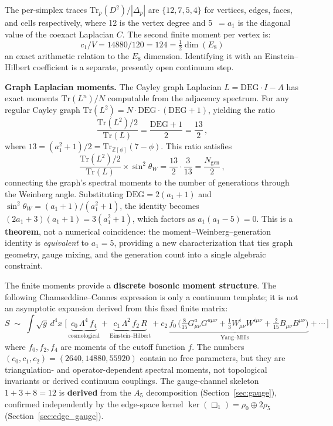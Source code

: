 \documentclass[12pt,a4paper]{article}
\theoremstyle{definition}
\begin{document}
The per-simplex traces $\mathrm{Tr}_p(D^2) / |\Delta_p|$ are $\{12, 7, 5, 4\}$ for vertices, edges, faces, and cells respectively, where 12 is the vertex degree and 5~$= a_1$ is the diagonal value of the coexact Laplacian $C$. The second finite moment per vertex is:
\begin{equation}
c_1 / V = 14880 / 120 = 124 = \tfrac{1}{2}\dim(E_8)
\end{equation}
an exact arithmetic relation to the $E_8$ dimension.  Identifying it with an
Einstein--Hilbert coefficient is a separate, presently open continuum step.

\textbf{Graph Laplacian moments.}  The Cayley graph Laplacian $L = \mathrm{DEG}\cdot I - A$ has exact moments $\mathrm{Tr}(L^n)/N$ computable from the adjacency spectrum.  For any regular Cayley graph $\mathrm{Tr}(L^2) = N\cdot\mathrm{DEG}\cdot(\mathrm{DEG}+1)$, yielding the ratio
\begin{equation}
\frac{\mathrm{Tr}(L^2)/2}{\mathrm{Tr}(L)} = \frac{\mathrm{DEG}+1}{2} = \frac{13}{2}\,,
\end{equation}
where $13 = (a_1^2+1)/2 = \mathrm{Tr}_{\mathbb{Z}[\phi]}(7-\phi)$.  This ratio satisfies
\begin{equation}
\frac{\mathrm{Tr}(L^2)/2}{\mathrm{Tr}(L)} \times \sin^2\theta_W = \frac{13}{2}\cdot\frac{3}{13} = \frac{N_{\mathrm{gen}}}{2}\,,
\label{eq:moment_weinberg}
\end{equation}
connecting the graph's spectral moments to the number of generations through the Weinberg angle.  Substituting $\mathrm{DEG} = 2(a_1\!+\!1)$ and $\sin^2\theta_W = (a_1\!+\!1)/(a_1^2\!+\!1)$, the identity becomes $(2a_1\!+\!3)(a_1\!+\!1) = 3(a_1^2\!+\!1)$, which factors as $a_1(a_1 - 5) = 0$.  This is a \textbf{theorem}, not a numerical coincidence: the moment--Weinberg--generation identity is \emph{equivalent} to $a_1 = 5$, providing a new characterization that ties graph geometry, gauge mixing, and the generation count into a single algebraic constraint.

The finite moments provide a \textbf{discrete bosonic moment structure}.  The
following Chamseddine--Connes expression is only a continuum template; it is
not an asymptotic expansion derived from this fixed finite matrix:
\begin{equation}
S \;\sim\; \int\!\sqrt{g}\,d^4x\;\Big[\, \underbrace{c_0\,\Lambda^4\,f_4}_{\text{cosmological}} + \underbrace{c_1\,\Lambda^2\,f_2\,R}_{\text{Einstein--Hilbert}} + \underbrace{c_2\,f_0\,\big(\tfrac{8}{15}G^a_{\mu\nu}G^{a\mu\nu} + \tfrac{1}{3}W^i_{\mu\nu}W^{i\mu\nu} + \tfrac{2}{15}B_{\mu\nu}B^{\mu\nu}\big)}_{\text{Yang--Mills}} + \cdots\,\Big]
\label{eq:lagrangian_explicit}
\end{equation}
where $f_0, f_2, f_4$ are moments of the cutoff function $f$. The numbers $(c_0, c_1, c_2) = (2640, 14880, 55920)$ contain no free parameters, but they are triangulation- and operator-dependent spectral moments, not topological invariants or derived continuum couplings.  The gauge-channel skeleton $1 + 3 + 8 = 12$ is \textbf{derived} from the $A_5$ decomposition (Section~\ref{sec:gauge}), confirmed independently by the edge-space kernel $\ker(\Box_1) = \rho_0 \oplus 2\rho_5$ (Section~\ref{sec:edge_gauge}).
\end{document}
